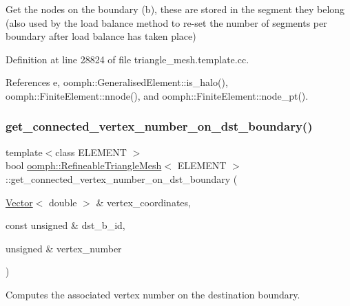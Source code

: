 Get the nodes on the boundary (b), these are stored in the segment they belong (also used by the load balance method to re-\/set the number of segments per boundary after load balance has taken place) 



Definition at line 28824 of file triangle\+\_\+mesh.\+template.\+cc.



References e, oomph\+::\+Generalised\+Element\+::is\+\_\+halo(), oomph\+::\+Finite\+Element\+::nnode(), and oomph\+::\+Finite\+Element\+::node\+\_\+pt().

\mbox{\label{classoomph_1_1RefineableTriangleMesh_a097fbc660755f2127f575580d086c3aa}} 
\subsubsection{\texorpdfstring{get\+\_\+connected\+\_\+vertex\+\_\+number\+\_\+on\+\_\+dst\+\_\+boundary()}{get\_connected\_vertex\_number\_on\_dst\_boundary()}}
{\footnotesize\ttfamily template$<$class E\+L\+E\+M\+E\+NT $>$ \\
bool \hyperlink{classoomph_1_1RefineableTriangleMesh}{oomph\+::\+Refineable\+Triangle\+Mesh}$<$ E\+L\+E\+M\+E\+NT $>$\+::get\+\_\+connected\+\_\+vertex\+\_\+number\+\_\+on\+\_\+dst\+\_\+boundary (\begin{DoxyParamCaption}\item[{\hyperlink{classoomph_1_1Vector}{Vector}$<$ double $>$ \&}]{vertex\+\_\+coordinates,  }\item[{const unsigned \&}]{dst\+\_\+b\+\_\+id,  }\item[{unsigned \&}]{vertex\+\_\+number }\end{DoxyParamCaption})\hspace{0.3cm}{\ttfamily [protected]}}



Computes the associated vertex number on the destination boundary. 

